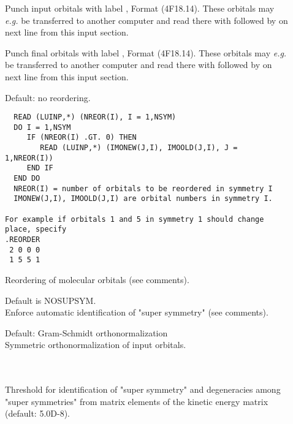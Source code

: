 \begin{description}

\item[]
  Punch input orbitals with label , Format (4F18.14).
  These orbitals may {\it e.g.\/} be transferred to another computer and
  read there with  followed by  on
  next line from this input section.

\item[]
  Punch final orbitals with label , Format (4F18.14).
  These orbitals may {\it e.g.\/} be transferred to another computer and
  read there with  followed by  on
  next line from this input section.

\item[]
Default: no reordering.
\begin{verbatim}
  READ (LUINP,*) (NREOR(I), I = 1,NSYM)
  DO I = 1,NSYM
     IF (NREOR(I) .GT. 0) THEN
        READ (LUINP,*) (IMONEW(J,I), IMOOLD(J,I), J = 1,NREOR(I))
     END IF
  END DO
  NREOR(I) = number of orbitals to be reordered in symmetry I
  IMONEW(J,I), IMOOLD(J,I) are orbital numbers in symmetry I.

For example if orbitals 1 and 5 in symmetry 1 should change place, specify
.REORDER
 2 0 0 0
 1 5 5 1
\end{verbatim}
  Reordering of molecular orbitals (see comments).

\item[]
  Default is NOSUPSYM.\\
  Enforce automatic identification of "super
  symmetry" (see comments).

\item[]
  Default: Gram-Schmidt orthonormalization\\
  Symmetric orthonormalization of input
  orbitals.

\item[] \ \\
   \\
  Threshold for identification of "super
  symmetry" and degeneracies among
  "super symmetries" from matrix elements of the kinetic energy matrix
  (default: 5.0D-8).

\end{description}


